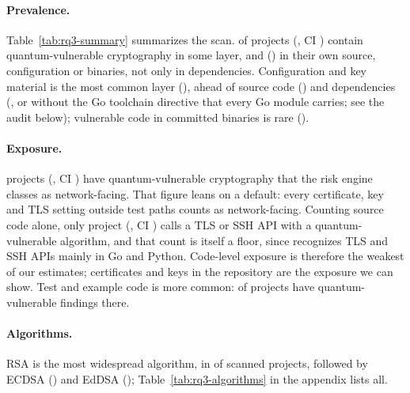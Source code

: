 \begin{table}[t]
\centering\footnotesize\setlength{\tabcolsep}{4pt}

\caption{Scanned projects with at least one quantum-vulnerable finding
($n$ of ), with Wilson 95\% intervals, and the number
of findings. ``Used'' excludes dependency findings, which show a capability,
not a use.}
\label{tab:rq3-summary}
\end{table}

\paragraph{Prevalence.} Table~\ref{tab:rq3-summary} summarizes the scan.
 of  projects
(, CI ) contain
quantum-vulnerable cryptography in some layer, and
 () in their own source,
configuration or binaries, not only in dependencies. Configuration and key
material is the most common layer (), ahead of
source code () and dependencies
(, or  without the
Go toolchain directive that every Go module carries; see the audit below);
vulnerable code in committed binaries is rare ().

\paragraph{Exposure.}  projects
(, CI ) have
quantum-vulnerable cryptography that the risk engine classes as network-facing.
That figure leans on a default: every certificate, key and TLS setting outside
test paths counts as network-facing. Counting source code alone, only
 project (, CI
) calls a TLS or SSH API with a quantum-vulnerable
algorithm, and that count is itself a floor, since \tool{} recognizes TLS and
SSH APIs mainly in Go and Python. Code-level exposure is therefore the weakest
of our estimates; certificates and keys in the repository are the exposure we
can show. Test and example code is more common:  of
projects have quantum-vulnerable findings there.

\paragraph{Algorithms.} RSA is the most widespread algorithm, in
 of scanned projects, followed by ECDSA
() and EdDSA ();
Table~\ref{tab:rq3-algorithms} in the appendix lists all.

